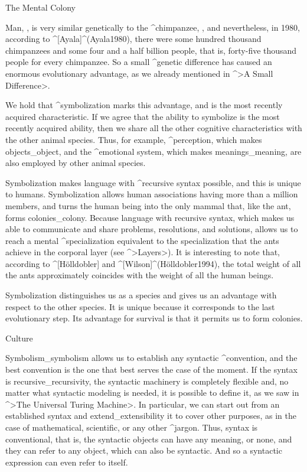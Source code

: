 \Section The Mental Colony

Man, , is very similar genetically to the
^{chimpanzee}, , and nevertheless, in 1980,
according to ^[Ayala]^(Ayala1980), there were some hundred thousand
chimpanzees and some four and a half billion people, that is, forty-five
thousand people for every chimpanzee. So a small ^{genetic} difference
has caused an enormous evolutionary advantage, as we already mentioned
in ^>A Small Difference>.

We hold that ^{symbolization} marks this advantage, and is the most
recently acquired characteristic. If we agree that the ability to
symbolize is the most recently acquired ability, then we share all the
other cognitive characteristics with the other animal species. Thus, for
example, ^{perception}, which makes objects_{object}, and the
^{emotional system}, which makes meanings_{meaning}, are also employed
by other animal species.

Symbolization makes language with ^{recursive syntax} possible, and this
is unique to humans. Symbolization allows human associations having more
than a million members, and turns the human being into the only mammal
that, like the {ant}, forms colonies_{colony}. Because language with
recursive syntax, which makes us able to communicate and share problems,
resolutions, and solutions, allows us to reach a mental
^{specialization} equivalent to the specialization that the ants achieve
in the corporal layer (see ^>Layers>). It is interesting to note that,
according to ^[Hölldobler] and ^[Wilson]^(H\"olldobler1994), the total
weight of all the ants approximately coincides with the weight of all
the human beings.

Symbolization distinguishes us as a species and gives us an advantage
with respect to the other species. It is unique because it corresponds
to the last evolutionary step. Its advantage for survival is that it
permits us to form colonies.


\Section Culture

Symbolism_{symbolism} allows us to establish any syntactic
^{convention}, and the best convention is the one that best serves the
case of the moment. If the syntax is recursive_{recursivity}, the
syntactic machinery is completely flexible and, no matter what syntactic
modeling is needed, it is possible to define it, as we saw in ^>The
Universal Turing Machine>. In particular, we can start out from an
established syntax and extend_{extensibility} it to cover other
purposes, as in the case of mathematical, scientific, or any other
^{jargon}. Thus, syntax is conventional, that is, the syntactic objects
can have any meaning, or none, and they can refer to any object, which
can also be syntactic. And so a syntactic expression can even refer to
itself.

